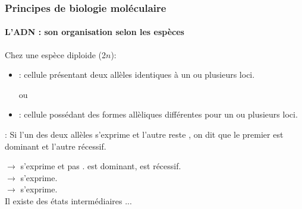 \begin{frame}
\frametitle{Principes de biologie moléculaire}
\framesubtitle{L'ADN : son organisation selon les espèces}

Chez une espèce diploide (2$n$):

\begin{itemize}
\item 
{} : cellule présentant deux allèles identiques à un ou plusieurs loci.
\begin{center}
 ou 
\end{center}

\item 
{} : cellule  possédant des formes allèliques différentes pour un ou plusieurs loci.
\begin{center}
\end{center}

\end{itemize}

: Si l'un des deux allèles s'exprime et l'autre reste , on dit que le premier est dominant et l'autre récessif.

 $\rightarrow$  s'exprime et pas .  est dominant,  est récessif. \\
 $\rightarrow$  s'exprime.\\
 $\rightarrow$  s'exprime.\\

Il existe des états intermédiaires ...

\end{frame}

